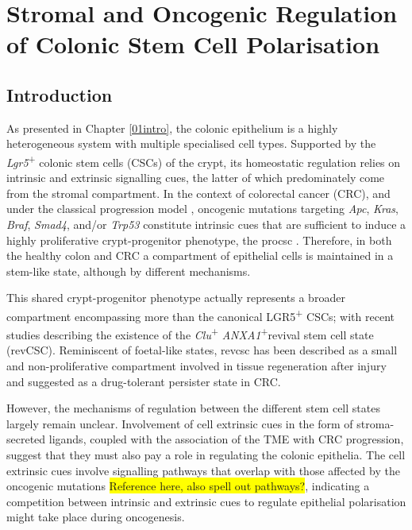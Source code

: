 \chapter{Stromal and Oncogenic Regulation of Colonic Stem Cell Polarisation}
\label{04seq}

\newpage
\section{Introduction}


As presented in Chapter \ref{01intro}, the colonic epithelium is a highly heterogeneous system with multiple specialised cell types. Supported by the \emph{Lgr5}\textsuperscript{+} colonic stem cells (CSCs) of the crypt, its homeostatic regulation relies on intrinsic and extrinsic signalling cues, the latter of which predominately come from the stromal compartment. In the context of colorectal cancer (CRC), and under the classical progression model \cite{fearon_genetic_1990}, oncogenic mutations targeting \textit{Apc}, \textit{Kras}, \textit{Braf}, \textit{Smad4}, and/or \textit{Trp53} constitute intrinsic cues that are sufficient to induce a highly proliferative crypt-progenitor phenotype, the \acrfull{procsc} \cite{van_de_wetering_-catenintcf-4_2002}.
Therefore, in both the healthy colon and CRC a compartment of epithelial cells is maintained in a stem-like state, although by different mechanisms. 

This shared crypt-progenitor phenotype actually represents a broader compartment encompassing more than the canonical LGR5\textsuperscript{+} CSCs; with recent studies describing the existence of the \emph{Clu}\textsuperscript{+} \emph{ANXA1}\textsuperscript{+}revival stem cell state (revCSC). Reminiscent of foetal-like states, \acrshort{revcsc} has been described as a small and non-proliferative compartment involved in tissue regeneration after injury and suggested as a drug-tolerant persister state in CRC. 

However, the mechanisms of regulation between the different stem cell states largely remain unclear.
Involvement of cell extrinsic cues in the form of stroma-secreted ligands, coupled with the association of the TME with CRC progression, suggest that they must also pay a role in regulating the colonic epithelia. The cell extrinsic cues involve signalling pathways that overlap with those affected by the oncogenic mutations \colorbox{yellow}{Reference here\cite{sphyris_subversion_2021}, also spell out pathways?}, indicating a competition between intrinsic and extrinsic cues to regulate epithelial polarisation might take place during oncogenesis.

